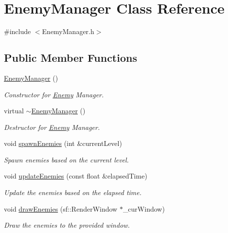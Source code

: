 \hypertarget{class_enemy_manager}{}\section{Enemy\+Manager Class Reference}
\label{class_enemy_manager}


{\ttfamily \#include $<$Enemy\+Manager.\+h$>$}

\subsection*{Public Member Functions}
\begin{DoxyCompactItemize}
\item 
\hyperlink{class_enemy_manager_ae8d3abb80956df199094432e49ca0d13}{Enemy\+Manager} ()
\begin{DoxyCompactList}\small\item\em Constructor for \hyperlink{class_enemy}{Enemy} Manager. \end{DoxyCompactList}\item 
virtual \hyperlink{class_enemy_manager_afe3583e45273d5509e59467d06a3feb6}{$\sim$\+Enemy\+Manager} ()
\begin{DoxyCompactList}\small\item\em Destructor for \hyperlink{class_enemy}{Enemy} Manager. \end{DoxyCompactList}\item 
void \hyperlink{class_enemy_manager_a37036db8aad73493103815dc45c6339d}{spawn\+Enemies} (int \&current\+Level)
\begin{DoxyCompactList}\small\item\em Spawn enemies based on the current level. \end{DoxyCompactList}\item 
void \hyperlink{class_enemy_manager_a8a3caf890d121478e41dcc192a8aa4a2}{update\+Enemies} (const float \&elapsed\+Time)
\begin{DoxyCompactList}\small\item\em Update the enemies based on the elapsed time. \end{DoxyCompactList}\item 
void \hyperlink{class_enemy_manager_af740dd63780a06fde9a5dd72330624da}{draw\+Enemies} (sf\+::\+Render\+Window $\ast$\+\_\+cur\+Window)
\begin{DoxyCompactList}\small\item\em Draw the enemies to the provided window. \end{DoxyCompactList}\item 

\end{DoxyCompactItemize}
